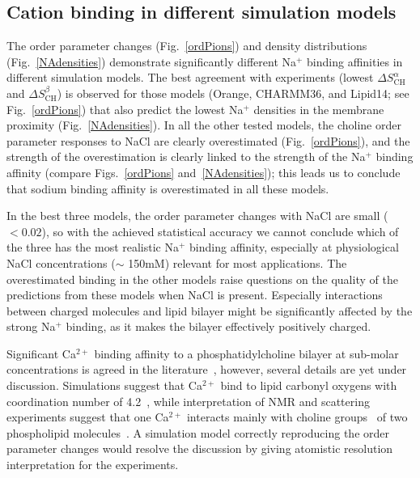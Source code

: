 \documentclass[twoside,twocolumn,9pt]{article}
\begin{document}
\subsection{Cation binding in different simulation models}

The order parameter changes (Fig.~\ref{ordPions}) and density distributions (Fig.~\ref{NAdensities})
demonstrate significantly different Na$^+$ binding affinities in different simulation models.
The best agreement with experiments (lowest $\Delta S_\mathrm{CH}^\alpha$ and $\Delta S_\mathrm{CH}^\beta$) is observed for those models (Orange, CHARMM36, and Lipid14; see Fig.~\ref{ordPions}) that also predict the lowest Na$^+$ densities 
in the membrane proximity (Fig.~\ref{NAdensities}).
In all the other tested models, the choline order parameter 
responses to NaCl are clearly overestimated (Fig.~\ref{ordPions}),
and the strength of the overestimation is clearly linked to the strength of the
Na$^+$ binding affinity (compare Figs.~\ref{ordPions} and~\ref{NAdensities});
this leads us to
conclude that sodium binding affinity is overestimated in all these models.


In the best three models, the order parameter changes with NaCl are small ($<0.02$), so
with the achieved statistical accuracy we cannot conclude 
which of the three has the most realistic Na$^+$ binding affinity,
especially at physiological NaCl concentrations ($\sim$ 150mM) 
relevant for most applications. 
The overestimated binding in the other models raise questions on the quality of the predictions from these models when NaCl is present.
Especially interactions between charged molecules and lipid bilayer might be significantly
affected by the strong Na$^+$ binding, as it makes the bilayer effectively positively charged.

Significant Ca$^{2+}$ binding affinity to a phosphatidylcholine bilayer at sub-molar concentrations  
is agreed in the literature~\cite{akutsu81,altenbach84,cevc90,tocanne90}, however, several
details are yet under discussion. Simulations suggest that Ca$^{2+}$ bind to lipid carbonyl
oxygens with coordination number of 4.2~\cite{bockmann04}, while interpretation of NMR and 
scattering experiments suggest that one Ca$^{2+}$ interacts mainly with choline 
groups~\cite{hauser76,hauser78,herbette84} of two phospholipid molecules~\cite{altenbach84}. 
A simulation model correctly reproducing the order parameter changes would resolve the discussion
by giving atomistic resolution interpretation for the experiments.
\end{document}
